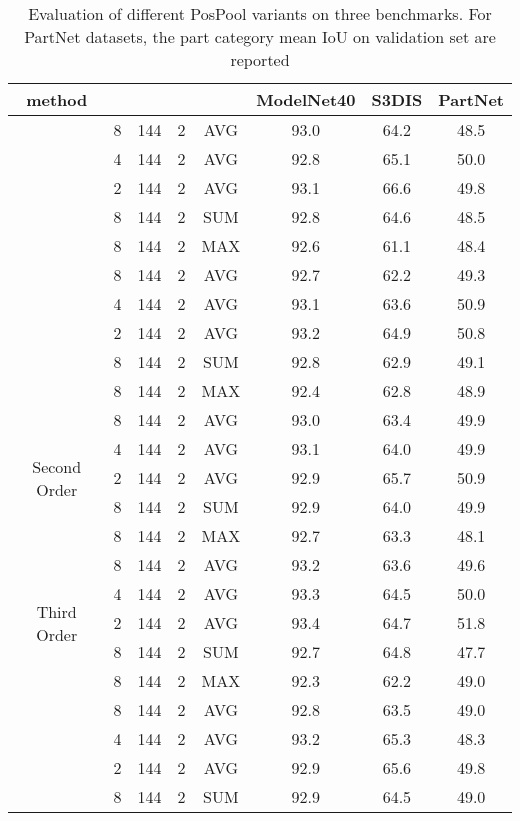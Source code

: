 \documentclass[runningheads]{llncs}
\begin{document}
\begin{small}
	\begin{table}[t]
		\centering
		\caption{Evaluation of different PosPool variants on three benchmarks. For PartNet datasets, the part category mean IoU on validation set are reported}
		\label{tab:pos_pool}
		\addtolength{\tabcolsep}{.1pt}
		\begin{tabular}{c|c|c|c|c|c|c|c}
			\Xhline{1.0pt}
			method&&&&&ModelNet40&S3DIS&PartNet\\
			\hline
			\multirow{5}{*}{} & 8 &144&2& AVG & 93.0 & 64.2 &  48.5\\
			& 4 &144&2&AVG & 92.8 & 65.1 &  50.0\\
			& 2 &144&2&AVG & 93.1 & 66.6 &49.8 \\
			& 8 &144&2& SUM & 92.8 & 64.6 &  48.5\\
			& 8 &144&2& MAX & 92.6 & 61.1 & 48.4\\
			\hline
			\multirow{5}{*}{}  & 8 &144&2& AVG & 92.7 & 62.2 & 49.3 \\
			& 4 &144&2& AVG & 93.1 & 63.6 & 50.9 \\
			& 2 &144&2& AVG & 93.2 & 64.9 & 50.8 \\
			& 8 &144&2& SUM & 92.8 & 62.9& 49.1 \\
			& 8 &144&2& MAX & 92.4 & 62.8 & 48.9 \\
			\hline
			\multirow{5}{*}{Second Order} & 8 &144&2& AVG & 93.0 & 63.4 & 49.9 \\
			& 4 &144&2& AVG & 93.1 & 64.0 & 49.9 \\
			& 2 &144&2& AVG & 92.9 & 65.7 & 50.9 \\
			& 8 &144&2& SUM & 92.9 & 64.0 & 49.9 \\
			& 8 &144&2& MAX & 92.7 & 63.3 & 48.1 \\
			\hline
			\multirow{5}{*}{Third Order} & 8 &144&2& AVG & 93.2 & 63.6 & 49.6\\
			& 4 &144&2& AVG & 93.3 & 64.5 & 50.0 \\
			& 2 &144&2& AVG &  93.4& 64.7 & 51.8 \\
			& 8 &144&2& SUM & 92.7 &  64.8&  47.7\\
			& 8 &144&2& MAX & 92.3 &  62.2&  49.0\\
			\hline
			\multirow{5}{*}{} & 8 &144&2& AVG & 92.8 & 63.5 & 49.0 \\
			& 4 &144&2& AVG & 93.2 & 65.3 & 48.3 \\
			& 2 &144&2& AVG & 92.9 & 65.6 & 49.8 \\
			& 8 &144&2& SUM & 92.9 & 64.5 & 49.0 \\

\end{tabular}
\end{table}
\end{small}
\end{document}
